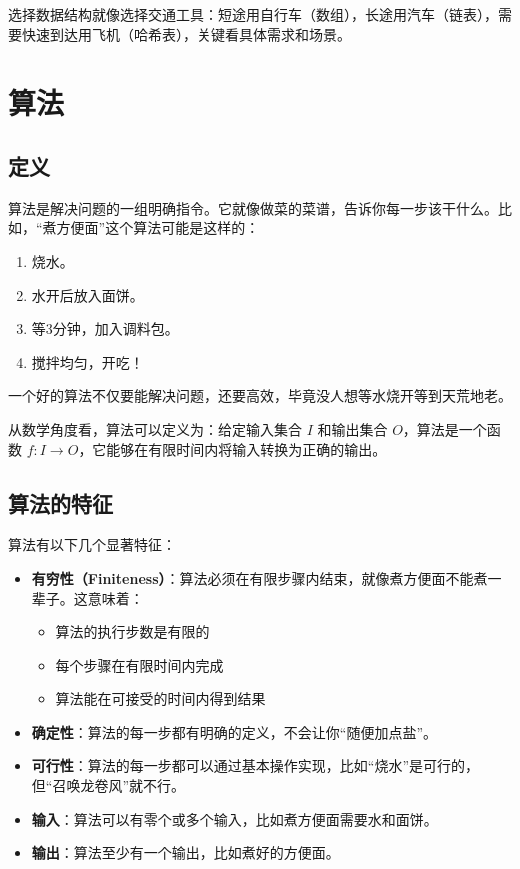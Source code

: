 \documentclass[lang=cn,newtx,10pt,scheme=chinese]{../elegantbook}
\begin{document}
选择数据结构就像选择交通工具：短途用自行车（数组），长途用汽车（链表），需要快速到达用飞机（哈希表），关键看具体需求和场景。

\section{算法}

\subsection{定义}
算法是解决问题的一组明确指令。它就像做菜的菜谱，告诉你每一步该干什么。比如，“煮方便面”这个算法可能是这样的：
\begin{enumerate}
    \item 烧水。
    \item 水开后放入面饼。
    \item 等3分钟，加入调料包。
    \item 搅拌均匀，开吃！
\end{enumerate}
一个好的算法不仅要能解决问题，还要高效，毕竟没人想等水烧开等到天荒地老。

从数学角度看，算法可以定义为：给定输入集合 $I$ 和输出集合 $O$，算法是一个函数 $f: I \rightarrow O$，它能够在有限时间内将输入转换为正确的输出。

\subsection{算法的特征}
算法有以下几个显著特征：
\begin{itemize}
    \item \textbf{有穷性（Finiteness）}：算法必须在有限步骤内结束，就像煮方便面不能煮一辈子。这意味着：
    \begin{itemize}
        \item 算法的执行步数是有限的
        \item 每个步骤在有限时间内完成
        \item 算法能在可接受的时间内得到结果
    \end{itemize}
    \item \textbf{确定性}：算法的每一步都有明确的定义，不会让你“随便加点盐”。
    \item \textbf{可行性}：算法的每一步都可以通过基本操作实现，比如“烧水”是可行的，但“召唤龙卷风”就不行。
    \item \textbf{输入}：算法可以有零个或多个输入，比如煮方便面需要水和面饼。
    \item \textbf{输出}：算法至少有一个输出，比如煮好的方便面。
\end{itemize}
\end{document}

